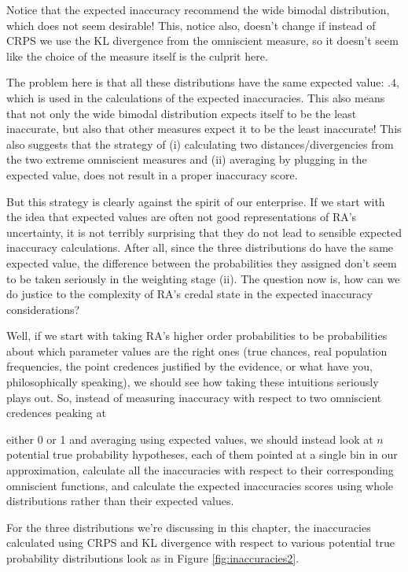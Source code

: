 \documentclass[
  10pt,
  dvipsnames,enabledeprecatedfontcommands]{scrartcl}
\begin{document}
Notice that the expected inaccuracy recommend the wide bimodal
distribution, which does not seem desirable! This, notice also, doesn't
change if instead of CRPS we use the KL divergence from the omniscient
measure, so it doesn't seem like the choice of the measure itself is the
culprit here.

The problem here is that all these distributions have the same expected
value: \(.4\), which is used in the calculations of the expected
inaccuracies. This also means that not only the wide bimodal
distribution expects itself to be the least inaccurate, but also that
other measures expect it to be the least inaccurate! This also suggests
that the strategy of (i) calculating two distances/divergencies from the
two extreme omniscient measures and (ii) averaging by plugging in the
expected value, does not result in a proper inaccuracy score.

But this strategy is clearly against the spirit of our enterprise. If we
start with the idea that expected values are often not good
representations of RA's uncertainty, it is not terribly surprising that
they do not lead to sensible expected inaccuracy calculations. After
all, since the three distributions do have the same expected value, the
difference between the probabilities they assigned don't seem to be
taken seriously in the weighting stage (ii). The question now is, how
can we do justice to the complexity of RA's credal state in the expected
inaccuracy considerations?

Well, if we start with taking RA's higher order probabilities to be
probabilities about which parameter values are the right ones (true
chances, real population frequencies, the point credences justified by
the evidence, or what have you, philosophically speaking), we should see
how taking these intuitions seriously plays out. So, instead of
measuring inaccuracy with respect to two omniscient credences peaking at

either 0 or 1 and averaging using expected values, we should instead
look at \(n\) potential true probability hypotheses, each of them
pointed at a single bin in our approximation, calculate all the
inaccuracies with respect to their corresponding omniscient functions,
and calculate the expected inaccuracies scores using whole distributions
rather than their expected values.

For the three distributions we're discussing in this chapter, the
inaccuracies calculated using CRPS and KL divergence with respect to
various potential true probability distributions look as in Figure
\ref{fig:inaccuracies2}.
\end{document}
